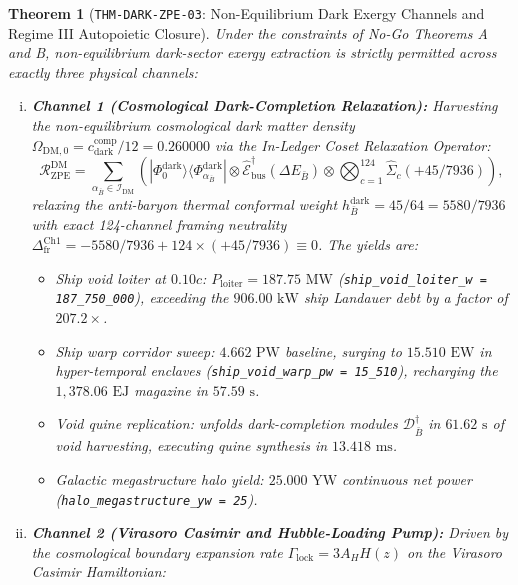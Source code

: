 \documentclass[11pt,onecolumn]{article}
\newtheorem{theorem}{Theorem}
\begin{document}
\begin{theorem}[\texttt{THM-DARK-ZPE-03}: Non-Equilibrium Dark Exergy Channels and Regime III Autopoietic Closure]
Under the constraints of No-Go Theorems A and B, non-equilibrium dark-sector exergy extraction is strictly permitted across exactly three physical channels:
\begin{enumerate}[(i)]
    \item \textbf{Channel 1 (Cosmological Dark-Completion Relaxation):} Harvesting the non-equilibrium cosmological dark matter density $\Omega_{\text{DM},0} = c_{\text{dark}}^{\text{comp}}/12 = 0.260000$ via the In-Ledger Coset Relaxation Operator:
    \begin{equation}
    \mathcal{R}_{\text{ZPE}}^{\text{DM}} = \sum_{\alpha_{\bar{B}} \in \mathcal{I}_{\text{DM}}} \left( |\Phi_0^{\text{dark}}\rangle\langle\Phi_{\alpha_{\bar{B}}}^{\text{dark}}| \otimes \hat{\mathcal{E}}_{\text{bus}}^\dagger(\Delta E_{\bar{B}}) \otimes \bigotimes_{c=1}^{124} \hat{\Sigma}_c(+45/7936) \right),
    \label{eq:thm_dark_zpe_03_ch1}
    \end{equation}
    relaxing the anti-baryon thermal conformal weight $h_{\bar{B}}^{\text{dark}} = 45/64 = 5580/7936$ with exact 124-channel framing neutrality $\Delta_{\text{fr}}^{\text{Ch1}} = -5580/7936 + 124\times(+45/7936) \equiv 0$. The yields are:
    \begin{itemize}
        \item Ship void loiter at $0.10c$: $P_{\text{loiter}} = 187.75\text{ MW}$ (\texttt{ship\_void\_loiter\_w = 187\_750\_000}), exceeding the $906.00\text{ kW}$ ship Landauer debt by a factor of $207.2\times$.
        \item Ship warp corridor sweep: $4.662\text{ PW}$ baseline, surging to $15.510\text{ EW}$ in hyper-temporal enclaves (\texttt{ship\_void\_warp\_pw = 15\_510}), recharging the $1{,}378.06\text{ EJ}$ magazine in $57.59\text{ s}$.
        \item Void quine replication: unfolds dark-completion modules $\mathcal{D}_{\bar{B}}^\dagger$ in $61.62\text{ s}$ of void harvesting, executing quine synthesis in $13.418\text{ ms}$.
        \item Galactic megastructure halo yield: $25.000\text{ YW}$ continuous net power (\texttt{halo\_megastructure\_yw = 25}).
    \end{itemize}
    \item \textbf{Channel 2 (Virasoro Casimir and Hubble-Loading Pump):} Driven by the cosmological boundary expansion rate $\Gamma_{\text{lock}} = 3A_H H(z)$ on the Virasoro Casimir Hamiltonian:

\end{enumerate}
\end{theorem}
\end{document}
